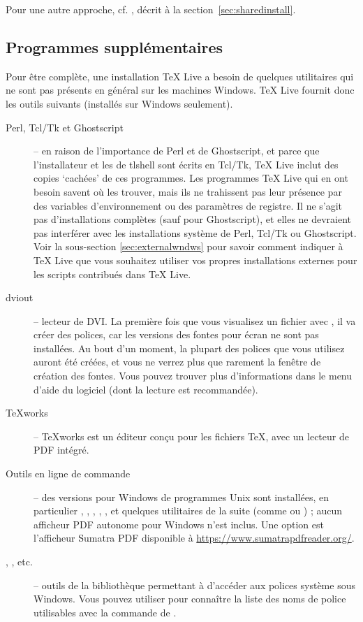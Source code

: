 \documentclass[german, english, french, 12pt]{article}
\renewcommand{\TL}{\TeX{} Live\xspace}%
\begin{document}
Pour une autre approche, cf. , décrit à la
section~\ref{sec:sharedinstall}.

\subsection{Programmes supplémentaires}

Pour être complète, une installation \TL a besoin de quelques utilitaires qui ne
sont pas présents en général sur les machines Windows. \TL fournit donc les
outils suivants (installés sur Windows seulement).
\begin{description}
\item [Perl, Tcl/Tk et Ghostscript]-- en  raison de l'importance de Perl et de
  Ghostscript, et parce que l'installateur et les \GUI{} de tlshell sont écrits
  en Tcl/Tk, \TL{} inclut des copies `cachées' de ces programmes. Les programmes
  \TL{} qui en ont besoin savent où les trouver, mais ils ne trahissent pas leur
  présence par des variables d'environnement ou des paramètres de registre. Il
  ne s'agit pas d'installations complètes (sauf pour Ghostscript), et elles ne
  devraient pas interférer avec les installations système de Perl, Tcl/Tk ou
  Ghostscript. Voir la sous-section \ref{sec:externalwndws} pour savoir comment
  indiquer à \TL{} que vous souhaitez utiliser vos propres installations
  externes pour les scripts contribués dans \TL.

\item[dviout] -- lecteur de DVI. La première fois que vous visualisez un fichier
  avec , il va créer des polices, car les versions des fontes pour
  écran ne sont pas installées. Au bout d'un moment, la plupart des polices que
  vous utilisez auront été créées, et vous ne verrez plus que rarement la
  fenêtre de création des fontes. Vous pouvez trouver plus d'informations dans
  le menu d'aide du logiciel (dont la lecture est recommandée).

\item[\TeX{}works] -- \TeX{}works est un éditeur conçu pour les fichiers \TeX,
  avec un lecteur de PDF intégré.

\item[Outils en ligne de commande] -- des versions pour Windows de programmes
  Unix sont installées, en particulier , ,
  , , ,  et
  quelques utilitaires de la suite  (comme  ou
  ) ; aucun afficheur PDF autonome pour Windows n'est
  inclus. Une option est l'afficheur Sumatra PDF disponible
  à \url{https://www.sumatrapdfreader.org/}.
\item[, , etc.] -- outils de la bibliothèque
   permettant à \XeTeX{} d'accéder aux polices système sous
  Windows. Vous pouvez utiliser  pour connaître la liste des noms
  de police utilisables avec la commande  de \XeTeX.
\end{description}
\end{document}
